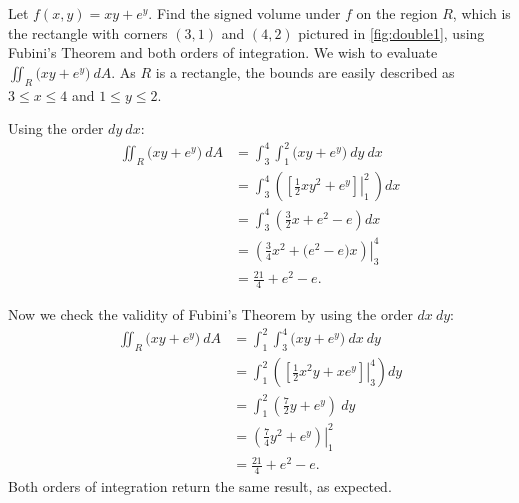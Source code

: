 
\begin{example}\label{ex_double1}
Let $f(x,y) = xy+e^y$. Find the signed volume under $f$ on the region $R$, which is the rectangle with corners $(3,1)$ and $(4,2)$ pictured in \autoref{fig:double1}, using Fubini's Theorem and both orders of integration.
\solution
We wish to evaluate $\iint_R \big(xy+e^y\big)\ dA$. As $R$ is a rectangle, the bounds are easily described as $3\leq x\leq 4$ and $1\leq y\leq 2$.\\


Using the order $dy\ dx$:
\begin{align*}
\iint_R\big(xy+e^y\big) \ dA
	&= \int_3^4\int_1^2\big(xy+e^y\big)\ dy \ dx \\
	&= \int_3^4 \left(\left.\left[\frac12xy^2+e^y\right]\right|_1^2\ \right) dx \\
	&= \int_3^4\left(\frac 32x + e^2-e\right)dx \\
	&= \left.\left(\frac 34x^2 + \big(e^2-e\big)x\right)\right|_3^4 \\
	&= \frac {21}4+ e^2-e%
	.
\end{align*}

Now we check the validity of Fubini's Theorem by using the order $dx\ dy$:
\begin{align*}
\iint_R\big(xy+e^y\big) \ dA &= \int_1^2\int_3^4\big(xy+e^y\big)\ dx \ dy \\
		&= \int_1^2\left(\left.\left[\frac12x^2y+xe^y\right]\right|_3^4\right)dy\\
		&= \int_1^2\left(\frac72y+e^y\right)\ dy\\
		&= \left.\left(\frac74y^2+e^y\right)\right|_1^2\\
		&=\frac{21}4+e^2-e%
		.
\end{align*}
Both orders of integration return the same result, as expected.
\end{example}

